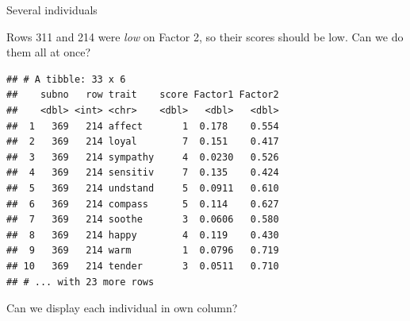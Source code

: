 \documentclass[
  ignorenonframetext,
]{beamer}
\newenvironment{Shaded}{\begin{snugshade}}{\end{snugshade}}
\newcommand{\DecValTok}[1]{\textcolor[rgb]{0.00,0.00,0.81}{#1}}
\newcommand{\FloatTok}[1]{\textcolor[rgb]{0.00,0.00,0.81}{#1}}
\newcommand{\KeywordTok}[1]{\textcolor[rgb]{0.13,0.29,0.53}{\textbf{#1}}}
\newcommand{\NormalTok}[1]{#1}
\newcommand{\OperatorTok}[1]{\textcolor[rgb]{0.81,0.36,0.00}{\textbf{#1}}}
\newcommand{\StringTok}[1]{\textcolor[rgb]{0.31,0.60,0.02}{#1}}
\begin{document}
\begin{frame}[fragile]{Several individuals}
\protect\hypertarget{several-individuals}{}

Rows 311 and 214 were \emph{low} on Factor 2, so their scores should be
low. Can we do them all at once?

\footnotesize

\begin{Shaded}
\end{Shaded}

\begin{verbatim}
## # A tibble: 33 x 6
##    subno   row trait    score Factor1 Factor2
##    <dbl> <int> <chr>    <dbl>   <dbl>   <dbl>
##  1   369   214 affect       1  0.178    0.554
##  2   369   214 loyal        7  0.151    0.417
##  3   369   214 sympathy     4  0.0230   0.526
##  4   369   214 sensitiv     7  0.135    0.424
##  5   369   214 undstand     5  0.0911   0.610
##  6   369   214 compass      5  0.114    0.627
##  7   369   214 soothe       3  0.0606   0.580
##  8   369   214 happy        4  0.119    0.430
##  9   369   214 warm         1  0.0796   0.719
## 10   369   214 tender       3  0.0511   0.710
## # ... with 23 more rows
\end{verbatim}

\normalsize

Can we display each individual in own column?

\end{frame}
\end{document}
